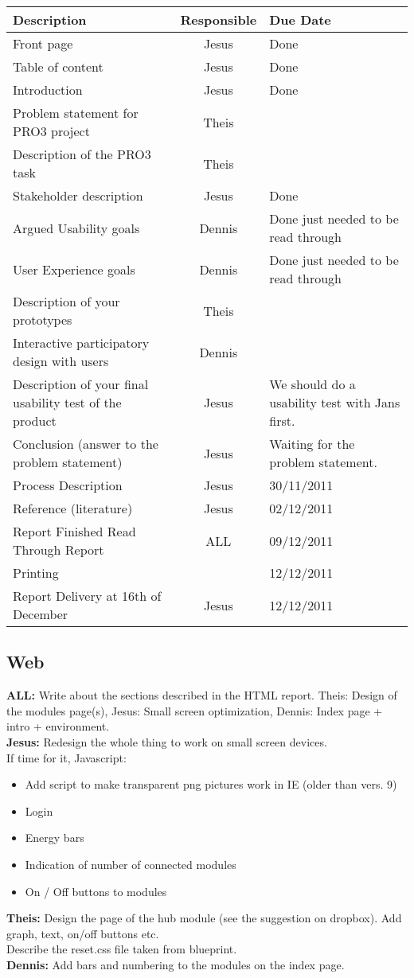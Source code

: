 \documentclass[10pt,a4paper]{article}
\begin{document}
\begin{tabular}{ | p{8cm} | c | p{5cm} |}
\hline
Description & Responsible & Due Date \\ \hline
Front page & Jesus & Done\\ \hline
Table of content & Jesus & Done \\ \hline
Introduction & Jesus & Done\\ \hline
Problem statement for PRO3 project & Theis & \\ \hline
Description of the PRO3 task & Theis & \\ \hline
Stakeholder description & Jesus  & Done\\ \hline
Argued Usability goals & Dennis & Done just needed to be read through\\ \hline
User Experience goals &  Dennis  & Done just needed to be read through\\ \hline
Description of your prototypes & Theis & \\ \hline
Interactive participatory design with users & Dennis  & \\ \hline
Description of your final usability test of the product & Jesus & We should do a usability test with Jans first. \\ \hline
Conclusion (answer to the problem statement) & Jesus  & Waiting for the problem statement.\\ \hline
Process Description & Jesus & 30/11/2011\\ \hline
Reference (literature) & Jesus  &  02/12/2011\\ \hline
Report Finished Read Through Report & ALL & 09/12/2011\\ \hline
Printing &  & 12/12/2011\\ \hline
Report Delivery at 16th of December & Jesus & 12/12/2011 \\ \hline
\hline
\end{tabular}

\subsection{Web}
\textbf{ALL:} Write about the sections described in the HTML report. Theis: Design of the modules page(s), Jesus: Small screen optimization, Dennis: Index page + intro + environment.
\\ \textbf{Jesus:} Redesign the whole thing to work on small screen devices.
\\If time for it, Javascript: 
\begin{itemize}
	\item Add script to make transparent png pictures work in IE (older than vers. 9)
	\item Login
	\item Energy bars
	\item Indication of number of connected modules
	\item On / Off buttons to modules
\end{itemize}
\textbf{Theis:}
Design the page of the hub module (see the suggestion on dropbox). Add graph, text, on/off buttons etc.
\\Describe the reset.css file taken from blueprint.
\\\textbf{Dennis:}
Add bars and numbering to the modules on the index page.
\end{document}
